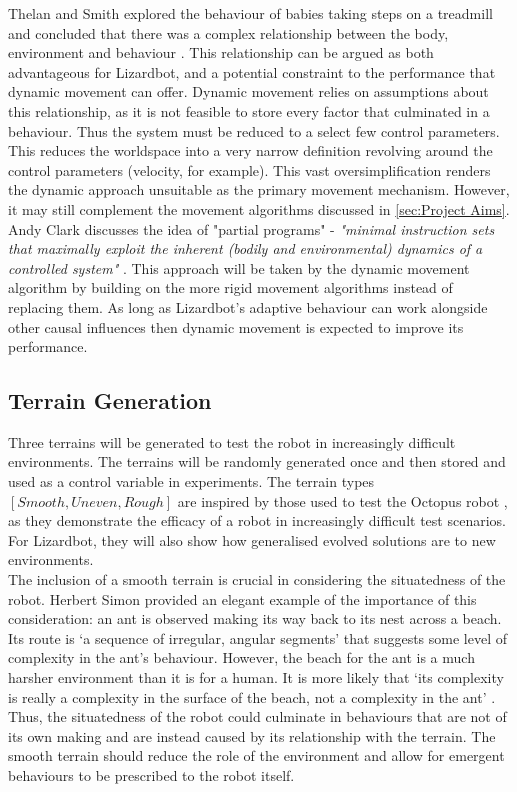 \documentclass{article}
\begin{document}
Thelan and Smith explored the behaviour of babies taking steps on a treadmill and concluded that there was a complex relationship between the body, environment and behaviour .
This relationship can be argued as both advantageous for Lizardbot, and a potential constraint to the performance that dynamic movement can offer. Dynamic movement relies on assumptions about this relationship, as it is not feasible to store every factor that culminated in a behaviour. Thus the system must be reduced to a select few control parameters. This reduces the worldspace into a very narrow definition revolving around the control parameters (velocity, for example). This vast oversimplification renders the dynamic approach unsuitable as the primary movement mechanism. However, it may still complement the movement algorithms discussed in \autoref{sec:Project Aims}. Andy Clark discusses the idea of "partial programs"  - \textit{"minimal instruction sets that maximally exploit the inherent (bodily and environmental) dynamics of a controlled system"} . This approach will be taken by the dynamic movement algorithm by building on the more rigid movement algorithms instead of replacing them.  As long as Lizardbot's adaptive behaviour can work alongside other causal influences then dynamic movement is expected to improve its performance.
 



\newpage
\subsection{Terrain Generation}
\label{sec:Terrain Generation}
Three terrains will be generated to test the robot in increasingly difficult environments. The terrains will be randomly generated once and then stored and used as a control variable in experiments. The terrain types $[Smooth, Uneven, Rough]$ are inspired by those used to test the Octopus robot , as they demonstrate the efficacy of a robot in increasingly difficult test scenarios. For Lizardbot, they will also show how generalised evolved solutions are to new environments. \\

The inclusion of a smooth terrain is crucial in considering the situatedness of the robot. Herbert Simon provided an elegant example of the importance of this consideration: an ant is observed making its way back to its nest across a beach.
Its route is ‘a sequence of irregular, angular segments’ that suggests some level of complexity in the ant's behaviour. However, the beach for the ant is a much harsher environment than it is for a human. It is more likely that ‘its complexity is really a complexity in the surface of the beach, not a complexity in the ant’ . Thus, the situatedness of the robot could culminate in behaviours that are not of its own making and are instead caused by its relationship with the terrain. The smooth terrain should reduce the role of the environment and allow for emergent behaviours to be prescribed to the robot itself.\\
\end{document}
